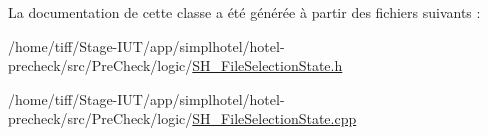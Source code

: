 La documentation de cette classe a été générée à partir des fichiers suivants \-:\begin{DoxyCompactItemize}
\item 
/home/tiff/\-Stage-\/\-I\-U\-T/app/simplhotel/hotel-\/precheck/src/\-Pre\-Check/logic/\hyperlink{SH__FileSelectionState_8h}{S\-H\-\_\-\-File\-Selection\-State.\-h}\item 
/home/tiff/\-Stage-\/\-I\-U\-T/app/simplhotel/hotel-\/precheck/src/\-Pre\-Check/logic/\hyperlink{SH__FileSelectionState_8cpp}{S\-H\-\_\-\-File\-Selection\-State.\-cpp}\end{DoxyCompactItemize}
